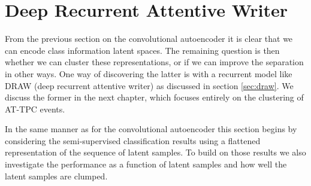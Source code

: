 \section{Deep Recurrent Attentive Writer }

From the previous section on the convolutional autoencoder it is clear that we can encode class information latent spaces. The remaining question is then whether we can cluster these representations, or if we can improve the separation in other ways. One way of discovering the latter is with a recurrent model like DRAW (deep recurrent attentive writer) as discussed in section \ref{sec:draw}. We discuss the former in the next chapter, which focuses entirely on the clustering of AT-TPC events.

In the same manner as for the convolutional autoencoder this section begins by considering the semi-supervised classification results using a flattened representation of the sequence of latent samples. To build on those results we also investigate the performance as a function of latent samples and how well the latent samples are clumped.

 